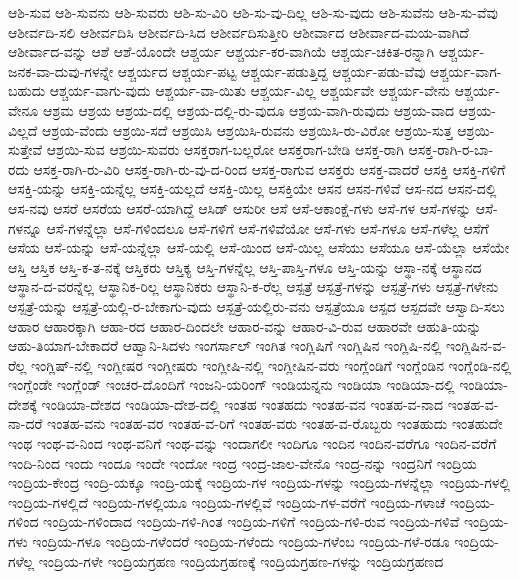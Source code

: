 {ಆಶಿ-ಸುವ
ಆಶಿ-ಸುವನು
ಆಶಿ-ಸುವರು
ಆಶಿ-ಸು-ವಿರಿ
ಆಶಿ-ಸು-ವು-ದಿಲ್ಲ
ಆಶಿ-ಸು-ವುದು
ಆಶಿ-ಸುವೆನು
ಆಶಿ-ಸು-ವೆವು
ಆಶೀರ್ವದಿ-ಸಲಿ
ಆಶೀರ್ವದಿಸಿ
ಆಶೀರ್ವದಿ-ಸಿದ
ಆಶೀರ್ವದಿಸುತ್ತೀರಿ
ಆಶೀರ್ವಾದ
ಆಶೀರ್ವಾದ-ಮಯ-ವಾಗಿದೆ
ಆಶೀರ್ವಾದ-ವನ್ನು
ಆಶೆ
ಆಶೆ-ಯೊಂದೇ
ಆಶ್ಚರ್ಯ
ಆಶ್ಚರ್ಯ-ಕರ-ವಾಗಿಯೆ
ಆಶ್ಚರ್ಯ-ಚಕಿತ-ರನ್ನಾಗಿ
ಆಶ್ಚರ್ಯ-ಜನಕ-ವಾ-ದುವು-ಗಳನ್ನೇ
ಆಶ್ಚರ್ಯದ
ಆಶ್ಚರ್ಯ-ಪಟ್ಟ
ಆಶ್ಚರ್ಯ-ಪಡುತ್ತಿದ್ದ
ಆಶ್ಚರ್ಯ-ಪಡು-ವೆವು
ಆಶ್ಚರ್ಯ-ವಾಗ-ಬಹುದು
ಆಶ್ಚರ್ಯ-ವಾಗು-ವುದು
ಆಶ್ಚರ್ಯ-ವಾ-ಯಿತು
ಆಶ್ಚರ್ಯ-ವಿಲ್ಲ
ಆಶ್ಚರ್ಯವೇ
ಆಶ್ಚರ್ಯ-ವೇನು
ಆಶ್ಚರ್ಯ-ವೇನೂ
ಆಶ್ರಮ
ಆಶ್ರಯ
ಆಶ್ರಯ-ದಲ್ಲಿ
ಆಶ್ರಯ-ದಲ್ಲಿ-ರು-ವುದೂ
ಆಶ್ರಯ-ವಾಗಿ-ರುವುದು
ಆಶ್ರಯ-ವಾದ
ಆಶ್ರಯ-ವಿಲ್ಲದೆ
ಆಶ್ರಯ-ವೆಂದು
ಆಶ್ರಯಿ-ಸದೆ
ಆಶ್ರಯಿಸಿ
ಆಶ್ರಯಿಸಿ-ರುವನು
ಆಶ್ರಯಿಸಿ-ರು-ವಿರೋ
ಆಶ್ರಯಿ-ಸುತ್ತ
ಆಶ್ರಯಿ-ಸುತ್ತೇವೆ
ಆಶ್ರಯಿ-ಸುವ
ಆಶ್ರಯಿ-ಸುವರು
ಆಸಕ್ತರಾಗ-ಬಲ್ಲರೋ
ಆಸಕ್ತರಾಗ-ಬೇಡಿ
ಆಸಕ್ತ-ರಾಗಿ
ಆಸಕ್ತ-ರಾಗಿ-ರ-ಬಾ-ರದು
ಆಸಕ್ತ-ರಾಗಿ-ರು-ವಿರಿ
ಆಸಕ್ತ-ರಾಗಿ-ರು-ವು-ದ-ರಿಂದ
ಆಸಕ್ತ-ರಾಗುವ
ಆಸಕ್ತರು
ಆಸಕ್ತ-ವಾದರೆ
ಆಸಕ್ತಿ
ಆಸಕ್ತಿ-ಗಳಿಗೆ
ಆಸಕ್ತಿ-ಯನ್ನು
ಆಸಕ್ತಿ-ಯನ್ನೆಲ್ಲ
ಆಸಕ್ತಿ-ಯಲ್ಲದೆ
ಆಸಕ್ತಿ-ಯಿಲ್ಲ
ಆಸಕ್ತಿಯೇ
ಆಸನ
ಆಸನ-ಗಳಿವೆ
ಆಸ-ನದ
ಆಸನ-ದಲ್ಲಿ
ಆಸ-ನವು
ಆಸರೆ
ಆಸರೆಯ
ಆಸರೆ-ಯಾಗಿದ್ದೆ
ಆಸಿಡ್
ಆಸುರೀ
ಆಸೆ
ಆಸೆ-ಆಕಾಂಕ್ಷೆ-ಗಳು
ಆಸೆ-ಗಳ
ಆಸೆ-ಗಳನ್ನು
ಆಸೆ-ಗಳನ್ನೂ
ಆಸೆ-ಗಳನ್ನೆಲ್ಲಾ
ಆಸೆ-ಗಳಿಂದಲೂ
ಆಸೆ-ಗಳಿಗೆ
ಆಸೆ-ಗಳಿವೆಯೋ
ಆಸೆ-ಗಳು
ಆಸೆ-ಗಳೂ
ಆಸೆ-ಗಳೆಲ್ಲ
ಆಸೆಗೆ
ಆಸೆಯ
ಆಸೆ-ಯನ್ನು
ಆಸೆ-ಯನ್ನೆಲ್ಲಾ
ಆಸೆ-ಯಲ್ಲಿ
ಆಸೆ-ಯಿಂದ
ಆಸೆ-ಯಿಲ್ಲ
ಆಸೆಯು
ಆಸೆಯೂ
ಆಸೆ-ಯೆಲ್ಲಾ
ಆಸೆಯೇ
ಆಸ್ತಿ
ಆಸ್ತಿಕ
ಆಸ್ತಿ-ಕ-ತ-ನಕ್ಕೆ
ಆಸ್ತಿಕರು
ಆಸ್ತಿಕ್ಯ
ಆಸ್ತಿ-ಗಳನ್ನೆಲ್ಲ
ಆಸ್ತಿ-ಪಾಸ್ತಿ-ಗಳೂ
ಆಸ್ತಿ-ಯನ್ನು
ಆಸ್ಥಾ-ನಕ್ಕೆ
ಆಸ್ಥಾನದ
ಆಸ್ಥಾನ-ದ-ವರನ್ನೆಲ್ಲ
ಆಸ್ಥಾನಿಕ-ರಿಲ್ಲ
ಆಸ್ಥಾನಿಕರು
ಆಸ್ಥಾನಿ-ಕ-ರೆಲ್ಲ
ಆಸ್ಪತ್ರೆ
ಆಸ್ಪತ್ರೆ-ಗಳನ್ನು
ಆಸ್ಪತ್ರೆ-ಗಳು
ಆಸ್ಪತ್ರೆ-ಗಳೇನು
ಆಸ್ಪತ್ರೆ-ಯನ್ನು
ಆಸ್ಪತ್ರೆ-ಯಲ್ಲಿ-ರ-ಬೇಕಾಗು-ವುದು
ಆಸ್ಪತ್ರೆ-ಯಲ್ಲಿರು-ವನು
ಆಸ್ಪತ್ರೆಯೂ
ಆಸ್ಪದ
ಆಸ್ಪದವೇ
ಆಸ್ವಾದಿ-ಸಲು
ಆಹಾರ
ಆಹಾರಕ್ಕಾಗಿ
ಆಹಾ-ರದ
ಆಹಾರ-ದಿಂದಲೇ
ಆಹಾರ-ವನ್ನು
ಆಹಾರ-ವಿ-ರುವ
ಆಹಾರವೇ
ಆಹುತಿ-ಯನ್ನು
ಆಹು-ತಿಯಾಗ-ಬೇಕಾದರೆ
ಆಹ್ವಾನಿ-ಸಿದಳು
ಇಂಗರ್ಸಾಲ್
ಇಂಗಿತ
ಇಂಗ್ಲಿಷಿಗೆ
ಇಂಗ್ಲಿಷಿನ
ಇಂಗ್ಲಿಷಿ-ನಲ್ಲಿ
ಇಂಗ್ಲಿಷಿನ-ವ-ರೆಲ್ಲ
ಇಂಗ್ಲಿಷ್-ನಲ್ಲಿ
ಇಂಗ್ಲೀಷರ
ಇಂಗ್ಲೀಷರು
ಇಂಗ್ಲೀಷಿ-ನಲ್ಲಿ
ಇಂಗ್ಲೀಷಿನ-ವರು
ಇಂಗ್ಲೆಂಡಿಗೆ
ಇಂಗ್ಲೆಂಡಿನ
ಇಂಗ್ಲೆಂಡಿ-ನಲ್ಲಿ
ಇಂಗ್ಲೆಂಡೇ
ಇಂಗ್ಲೆಂಡ್
ಇಂಚರ-ದೊಂದಿಗೆ
ಇಂಜನಿ-ಯರಿಂಗ್
ಇಂಡಿಯನ್ನನು
ಇಂಡಿಯಾ
ಇಂಡಿಯಾ-ದಲ್ಲಿ
ಇಂಡಿಯಾ-ದೇಶಕ್ಕೆ
ಇಂಡಿಯಾ-ದೇಶದ
ಇಂಡಿಯಾ-ದೇಶ-ದಲ್ಲಿ
ಇಂತಹ
ಇಂತಹದು
ಇಂತಹ-ವನ
ಇಂತಹ-ವ-ನಾದ
ಇಂತಹ-ವ-ನಾ-ದರೆ
ಇಂತಹ-ವನು
ಇಂತಹ-ವರ
ಇಂತಹ-ವ-ರಿಗೆ
ಇಂತಹ-ವರು
ಇಂತಹ-ವ-ರೊಬ್ಬರು
ಇಂತಹುದು
ಇಂತಹುದೇ
ಇಂಥ
ಇಂಥ-ವ-ನಿಂದ
ಇಂಥ-ವನಿಗೆ
ಇಂಥ-ವನ್ನು
ಇಂದಾಗಲೀ
ಇಂದಿಗೂ
ಇಂದಿನ
ಇಂದಿನ-ವರೆಗೂ
ಇಂದಿನ-ವರೆಗೆ
ಇಂದಿ-ನಿಂದ
ಇಂದು
ಇಂದೂ
ಇಂದೇ
ಇಂದೋ
ಇಂದ್ರ
ಇಂದ್ರ-ಜಾಲ-ವೇನೊ
ಇಂದ್ರ-ನನ್ನು
ಇಂದ್ರನಿಗೆ
ಇಂದ್ರಿಯ
ಇಂದ್ರಿಯ-ಕೇಂದ್ರ
ಇಂದ್ರಿ-ಯಕ್ಕೂ
ಇಂದ್ರಿ-ಯಕ್ಕೆ
ಇಂದ್ರಿಯ-ಗಳ
ಇಂದ್ರಿಯ-ಗಳನ್ನು
ಇಂದ್ರಿಯ-ಗಳನ್ನೆಲ್ಲಾ
ಇಂದ್ರಿಯ-ಗಳಲ್ಲಿ
ಇಂದ್ರಿಯ-ಗಳಲ್ಲಿದೆ
ಇಂದ್ರಿಯ-ಗಳಲ್ಲಿಯೂ
ಇಂದ್ರಿಯ-ಗಳಲ್ಲಿವೆ
ಇಂದ್ರಿಯ-ಗಳ-ವರೆಗೆ
ಇಂದ್ರಿಯ-ಗಳಾಚೆ
ಇಂದ್ರಿಯ-ಗಳಿಂದ
ಇಂದ್ರಿಯ-ಗಳಿಂದಾದ
ಇಂದ್ರಿಯ-ಗಳಿ-ಗಿಂತ
ಇಂದ್ರಿಯ-ಗಳಿಗೆ
ಇಂದ್ರಿಯ-ಗಳಿ-ರುವ
ಇಂದ್ರಿಯ-ಗಳಿವೆ
ಇಂದ್ರಿಯ-ಗಳು
ಇಂದ್ರಿಯ-ಗಳೂ
ಇಂದ್ರಿಯ-ಗಳೆಂದರೆ
ಇಂದ್ರಿಯ-ಗಳೆಂದು
ಇಂದ್ರಿಯ-ಗಳೆಂಬ
ಇಂದ್ರಿಯ-ಗಳೆ-ರಡೂ
ಇಂದ್ರಿಯ-ಗಳೆಲ್ಲ
ಇಂದ್ರಿಯ-ಗಳೇ
ಇಂದ್ರಿಯಗ್ರಹಣ
ಇಂದ್ರಿಯಗ್ರಹಣಕ್ಕೆ
ಇಂದ್ರಿಯಗ್ರಹಣ-ಗಳನ್ನು
ಇಂದ್ರಿಯಗ್ರಹಣದ
}
